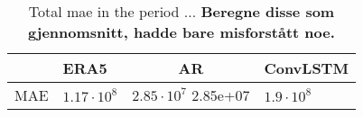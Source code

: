 \begin{table}[]
    \centering
    \begin{tabular}{llll}
    \multicolumn{1}{c}{\textbf{}} & \textbf{ERA5} & \multicolumn{1}{c}{\textbf{AR}} & \multicolumn{1}{c}{\textbf{ConvLSTM}} \\ \hline
    MAE & $1.17\cdot10^8$ & $2.85\cdot10^7$ 2.85e+07 & $1.9 \cdot 10^8$ 
    \end{tabular}
    \caption{Total \acrfull{mae} in the period ... \textbf{Beregne disse som gjennomsnitt, hadde bare misforstått noe.}}
    \label{tab:tot_mae_score}
\end{table}